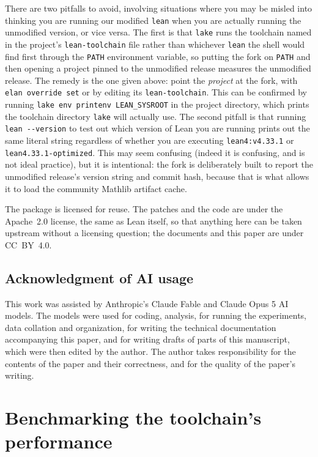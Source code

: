 \documentclass{article}
\newcommand{\Lean}{Lean\xspace}      %
\newcommand{\lean}{\texttt{lean}\xspace}      %
\newcommand{\lake}{\texttt{lake}\xspace}      %
\newcommand{\mathlib}{Mathlib\xspace}
\newcommand{\currentlean}{\texttt{lean4:v4.33.1}\xspace}
\newcommand{\altlean}{\texttt{lean4.33.1-\allowbreak optimized}\xspace}
\begin{document}
There are two pitfalls to avoid, involving situations where you may be misled into thinking you are running our modified \lean when you are actually running the unmodified version, or vice versa. The first is that \lake runs the
toolchain named in the project's \texttt{lean-toolchain} file rather than whichever \texttt{lean}
the shell would find first through the \texttt{PATH} environment variable, so putting the fork on
\texttt{PATH} and then opening a project pinned to the unmodified release measures the unmodified release. The remedy is the one given above: point the \emph{project} at the
fork, with \texttt{elan override set} or by editing its \texttt{lean-toolchain}. This can be
confirmed by running \texttt{lake env printenv LEAN\_SYSROOT} in the project directory, which
prints the toolchain directory \lake will actually use. The second pitfall is that
running \texttt{lean -{}-version} to test out which version of \Lean you are running prints out the same literal string regardless of whether you are executing \currentlean or \altlean. This may seem confusing (indeed it is confusing, and is not ideal practice), but it is intentional: the fork is deliberately built to report the unmodified release's version string and commit hash, because that is what allows it to load the community \mathlib artifact cache. 

The package is licensed for reuse. The patches and the code are under the Apache~2.0 license, the
same as \Lean itself, so that anything here can be taken upstream without a licensing question; the
documents and this paper are under CC~BY~4.0.

\subsection{Acknowledgment of AI usage}

This work was assisted by Anthropic's Claude Fable and Claude Opus 5 AI models. The models were used for coding, analysis, for running the experiments, data collation and organization, for writing the technical documentation accompanying this paper, and for writing drafts of parts of this manuscript, which were then edited by the author. The author takes responsibility for the contents of the paper and their correctness, and for the quality of the paper's writing.

\section{Benchmarking the toolchain's performance}
\label{sec:bench}
\end{document}
